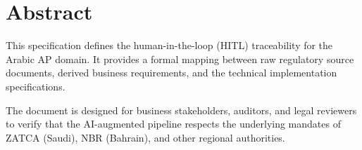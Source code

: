\chapter*{Abstract}

This specification defines the human-in-the-loop (HITL) traceability for the Arabic AP domain. It provides a formal mapping between raw regulatory source documents, derived business requirements, and the technical implementation specifications. 

The document is designed for business stakeholders, auditors, and legal reviewers to verify that the AI-augmented pipeline respects the underlying mandates of ZATCA (Saudi), NBR (Bahrain), and other regional authorities.
